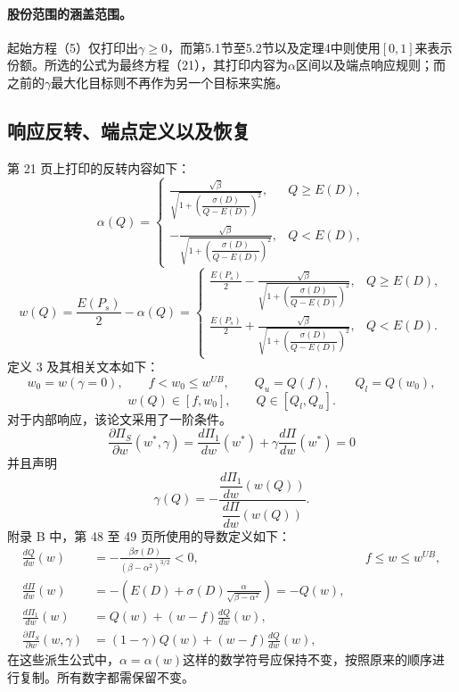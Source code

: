 \documentclass{article}
\begin{document}
\paragraph{股份范围的涵盖范围。}
起始方程（5）仅打印出$\gamma\geq0$，而第5.1节至5.2节以及定理4中则使用$[0,1]$来表示份额。所选的公式为最终方程（21），其打印内容为$\alpha$区间以及端点响应规则；而之前的$\gamma$最大化目标则不再作为另一个目标来实施。

\subsection*{响应反转、端点定义以及恢复}
第 21 页上打印的反转内容如下：
\[
\alpha(Q)=
\begin{cases}
\displaystyle\frac{\sqrt{\beta}}{\sqrt{1+\left(\dfrac{\sigma(D)}{Q-E(D)}\right)^2}},&Q\geq E(D),\\[6pt]
\displaystyle-\frac{\sqrt{\beta}}{\sqrt{1+\left(\dfrac{\sigma(D)}{Q-E(D)}\right)^2}},&Q<E(D),
\end{cases}
\]
\[
w(Q)=\frac{E(P_s)}2-\alpha(Q)=
\begin{cases}
\displaystyle\frac{E(P_s)}2-\frac{\sqrt{\beta}}{\sqrt{1+\left(\dfrac{\sigma(D)}{Q-E(D)}\right)^2}},&Q\geq E(D),\\[6pt]
\displaystyle\frac{E(P_s)}2+\frac{\sqrt{\beta}}{\sqrt{1+\left(\dfrac{\sigma(D)}{Q-E(D)}\right)^2}},&Q<E(D).
\end{cases}
\]
定义 3 及其相关文本如下：
\[
w_0=w(\gamma=0),\qquad f<w_0\leq w^{UB},\qquad
Q_u=Q(f),\qquad Q_l=Q(w_0),
\]
\[
w(Q)\in[f,w_0],\qquad Q\in[Q_l,Q_u].
\]
对于内部响应，该论文采用了一阶条件。
\[
\frac{\partial\Pi_S}{\partial w}(w^*,\gamma)
=\frac{d\Pi_1}{dw}(w^*)+\gamma\frac{d\Pi}{dw}(w^*)=0
\]
并且声明
\begin{equation}
\gamma(Q)=-\frac{\dfrac{d\Pi_1}{dw}(w(Q))}
{\dfrac{d\Pi}{dw}(w(Q))}.
\tag{20}
\end{equation}
附录 B 中，第 48 至 49 页所使用的导数定义如下：
\begin{align}
\frac{dQ}{dw}(w)&=-\frac{\beta\sigma(D)}{(\beta-\alpha^2)^{3/2}}<0,
&&f\leq w\leq w^{UB},\tag{48}\\
\frac{d\Pi}{dw}(w)&=-\left(E(D)+\sigma(D)\frac{\alpha}{\sqrt{\beta-\alpha^2}}\right)=-Q(w),\tag{49}\\
\frac{d\Pi_1}{dw}(w)&=Q(w)+(w-f)\frac{dQ}{dw}(w),\tag{50}\\
\frac{\partial\Pi_S}{\partial w}(w,\gamma)&=(1-\gamma)Q(w)+(w-f)\frac{dQ}{dw}(w),\tag{51}
\end{align}
在这些派生公式中，$\alpha=\alpha(w)$这样的数学符号应保持不变，按照原来的顺序进行复制。所有数字都需保留不变。
\end{document}
